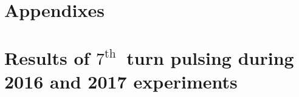 \documentclass[%
 reprint,
 amsmath,amssymb,
 aps,
prstab,
]{revtex4-1}
\begin{document}
\appendix

\section{Appendixes}
\section{Results of $7^{\mathrm{th}}$~turn pulsing during 2016 and 2017 experiments}

\end{document}
